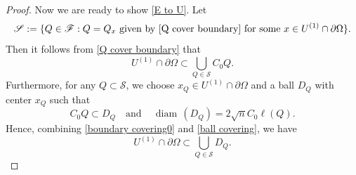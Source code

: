 \documentclass[reqno,11pt]{amsart}
\def\diam{{\mathop\mathrm{\,diam\,}}}
\numberwithin{equation}{section}
\theoremstyle{remark}
\begin{document}
\begin{proof}
Now we are ready to show \eqref{E to U}. Let 
$$\mathscr S:=\{Q\in \mathscr{F}:Q=Q_x \text{ given by \eqref{Q cover boundary} for some $x\in  U^{(1)}\cap \partial \Omega$}\}.$$ 
Then it follows from \eqref{Q cover boundary} that 
\begin{equation}\label{boundary covering0}
      U^{(1)}\cap \partial\Omega\subset   \bigcup_{Q\in \mathscr S} C_0 Q.
\end{equation}
Furthermore, for any $Q\subset \mathscr{S}$, we choose $x_Q\in U^{(1)}\cap \partial\Omega$ and a ball $D_{Q}$ with center $x_Q$ such that 
\begin{equation}\label{ball covering}
    C_0 Q\subset D_{Q} \quad \text{and}\quad \diam(D_Q)=2 \sqrt{n}C_0\ell(Q).
\end{equation}
Hence, combining \eqref{boundary covering0} and \eqref{ball covering}, we have 
\begin{equation}\label{boundary covering}
      U^{(1)}\cap \partial\Omega\subset \bigcup_{Q\in \mathscr S} D_Q.
\end{equation}


\end{proof}
\end{document}
